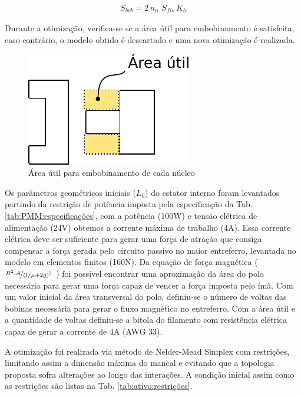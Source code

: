 \begin{align}
	S_{bob} = 2 \, n_n \, \, S_{fio} \, K_b
\end{align}

Durante a otimização, verifica-se se a área útil para embobinamento é satisfeita, caso contrário, o modelo obtido é descartado e uma nova otimização é realizada.

\begin{figure}[ht!]
\centering
\includegraphics[width=0.7\linewidth]{Figs/modelo_ativo_bobina}
\caption{Área útil para embobinamento de cada núcleo}
\label{fig:modelo_ativo_bobina}
\end{figure}

Os parâmetros geométricos iniciais ($L_0$) do estator interno foram levantados partindo da restrição de potência imposta pela especificação da Tab. \ref{tab:PMM:especificações}, com a potência (100W) e  tensão elétrica de alimentação (24V) obtemos a corrente máxima de trabalho (4A). Essa corrente elétrica deve ser suficiente para gerar uma força de atração que consiga compensar a força gerada pelo circuito passivo no maior entreferro, levantada no modelo em elementos finitos (160N). Da equação de força magnética ($\nicefrac{B^2.A}{(l/\mu +2g)^2}$ ) foi possível encontrar uma aproximação da área do polo necessária para gerar uma força capaz de vencer a força imposta pelo ímã. Com um valor inicial da área transversal do polo, definiu-se o número de voltas das bobinas necessária para gerar o fluxo magnético no entreferro. Com a área útil e a quantidade de voltas definiu-se a bitola do filamento com resistência elétrica capaz de gerar a corrente de 4A (AWG 33).

A otimização foi realizada via método de Nelder-Mead Simplex com restrições, limitando assim a dimensão máxima do mancal e evitando que a topologia proposta sofra alterações ao longo das interações. A condição inicial assim como as restrições são listas na Tab. \ref{tab:ativo:restrições}.

